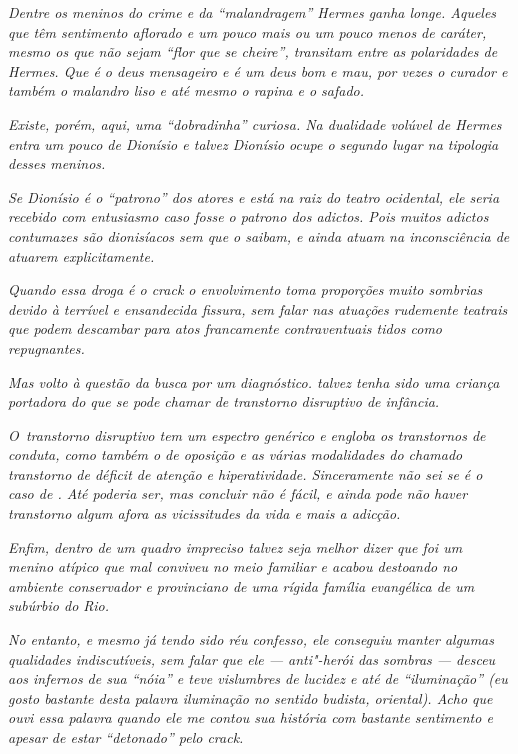 \emph{Dentre os meninos do crime e da ``malandragem'' Hermes ganha
longe. Aqueles que têm sentimento aflorado e um pouco mais ou um pouco
menos de caráter, mesmo os que não sejam ``flor que se cheire'',
transitam entre as polaridades de Hermes. Que é o deus mensageiro e é um
deus bom e mau, por vezes o curador e também o malandro liso e até mesmo
o rapina e o safado.}~

\emph{Existe, porém, aqui, uma ``dobradinha'' curiosa. Na dualidade
volúvel de Hermes entra um pouco de Dionísio e talvez Dionísio ocupe o
segundo lugar na tipologia desses meninos.}~

\emph{Se Dionísio é o ``patrono'' dos atores e está na raiz do teatro
ocidental, ele seria recebido com entusiasmo caso fosse o patrono dos
adictos. Pois muitos adictos contumazes são dionisíacos sem que o
saibam, e ainda atuam na inconsciência de atuarem explicitamente.}~

\emph{Quando essa droga é o crack o envolvimento toma proporções muito
sombrias devido à terrível e ensandecida fissura, sem falar nas atuações
rudemente teatrais que podem descambar para atos francamente
contraventuais tidos como repugnantes.}~

\emph{Mas volto à questão da busca por um diagnóstico.  talvez tenha
sido uma criança portadora do que se pode chamar de transtorno
disruptivo de infância.}~

\emph{O~transtorno disruptivo tem um espectro genérico e engloba os
transtornos de conduta, como também o de oposição e as várias
modalidades do chamado transtorno de déficit de atenção e
hiperatividade. Sinceramente não sei se é o caso de . Até poderia ser,
mas concluir não é fácil, e ainda pode não haver transtorno algum afora
as vicissitudes da vida e mais a adicção.}~

\emph{Enfim, dentro de um quadro impreciso talvez seja melhor dizer que
 foi um menino atípico que mal conviveu no meio familiar e acabou
destoando no ambiente conservador e provinciano de uma rígida família
evangélica de um subúrbio do Rio.}~

\emph{No entanto, e mesmo já tendo sido réu confesso, ele conseguiu
manter algumas qualidades indiscutíveis, sem falar que ele ---
anti"-herói das sombras --- desceu aos infernos de sua ``nóia'' e teve
vislumbres de lucidez e até de ``iluminação'' (eu gosto bastante desta
palavra iluminação no sentido budista, oriental). Acho que ouvi essa
palavra quando ele me contou sua história com bastante sentimento e
apesar de estar ``detonado'' pelo crack.}~

